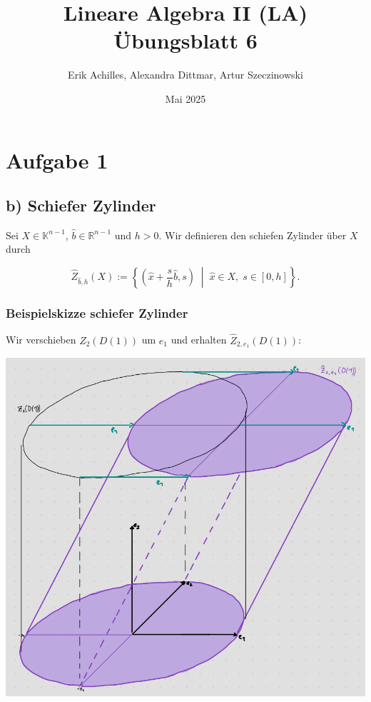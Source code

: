 \documentclass{article}
\title{Lineare Algebra II (LA) Übungsblatt 6}
\author{Erik Achilles, Alexandra Dittmar, Artur Szeczinowski}
\date{Mai 2025}
\begin{document}

\section*{Aufgabe 1}
\subsection*{b) Schiefer Zylinder}

Sei \( X \in \mathbb{K}^{n-1} \), \( \hat{b} \in \mathbb{R}^{n-1} \) und \( h > 0 \). Wir definieren den schiefen Zylinder über \( X \) durch

\[
\hat{Z}_{\hat{b},h}(X) := \left\{ 
\left( \hat{x} + \frac{s}{h} \hat{b}, s \right) \; \middle| \; \hat{x} \in X, \; s \in [0, h] 
\right\}.
\]

\subsubsection*{Beispielskizze schiefer Zylinder}
Wir verschieben $Z_2(D(1))$ um $e_1$ und erhalten $\hat{Z}_{2,e_1}(D(1))$:
\begin{center}
  \includegraphics[width=1\textwidth]{skizze.png}
\end{center}
\end{document}
